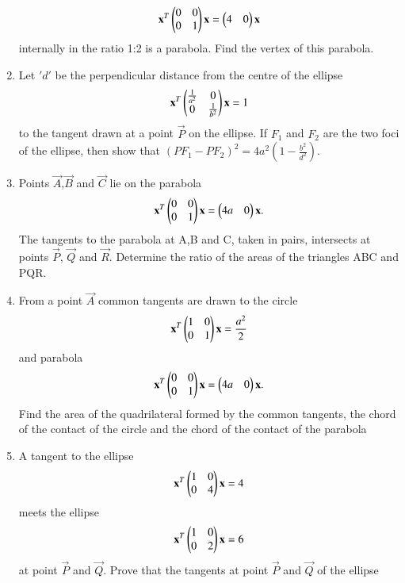 \documentclass[journal,12pt,twocolumn]{IEEEtran}
\begin{document}
\begin{enumerate}[label=\arabic*]
    \begin{align}
    \mathbf{x}^T\begin{pmatrix}0&0\\0&1\end{pmatrix}\mathbf{x}=\begin{pmatrix}4&0\end{pmatrix}\mathbf{x}
    \end{align} internally in the ratio 1:2 is a parabola. Find the vertex of this parabola.
    \item Let $'d'$ be the perpendicular distance from the centre of the ellipse
    \begin{align}
    \mathbf{x}^T\begin{pmatrix}\frac{1}{a^2}&0\\0&\frac{1}{b^2}\end{pmatrix}\mathbf{x}=1
    \end{align} to the tangent drawn at a point $\vec{P}$ on the ellipse. If $F_1$ and $F_2$ are the 		two foci of the ellipse, then show that $(PF_1-PF_2)^2=4a^2(1-\frac{b^2}{d^2})$.
    \item Points $\vec{A}$,$\vec{B}$ and $\vec{C}$ lie on the parabola 
    \begin{align}
    \mathbf{x}^T\begin{pmatrix}0&0\\0&1\end{pmatrix}\mathbf{x}=\begin{pmatrix}4a&0\end{pmatrix}\mathbf{x}.
    \end{align} The tangents to the parabola at A,B and C, taken in pairs, intersects at points   
    $\vec{P}$, $\vec{Q}$ and $\vec{R}$. Determine the ratio of the areas of the triangles ABC and 			PQR.
    \item From a point $\vec{A}$ common tangents are drawn to the circle 
    \begin{align}
    \mathbf{x}^T\begin{pmatrix}1&0\\0&1\end{pmatrix}\mathbf{x}=\frac{a^2}{2}
    \end{align} and parabola 
    \begin{align}
    \mathbf{x}^T\begin{pmatrix}0&0\\0&1\end{pmatrix}\mathbf{x}=\begin{pmatrix}4a&0\end{pmatrix}\mathbf{x}.
    \end{align} Find the area of the quadrilateral formed by the common tangents, the chord of the contact of the circle and the chord of the contact of the parabola
    \item A tangent to the ellipse 
    \begin{align}
    \mathbf{x}^T\begin{pmatrix}1&0\\0&4\end{pmatrix}\mathbf{x}=4
    \end{align} meets the ellipse 
    \begin{align}
    \mathbf{x}^T\begin{pmatrix}1&0\\0&2\end{pmatrix}\mathbf{x}=6 
    \end{align} at point $\vec{P}$ and $\vec{Q}$. Prove that the tangents at point $\vec{P}$ and 
    $\vec{Q}$ of the ellipse
    \begin{align}

\end{align}
\end{enumerate}
\end{document}
